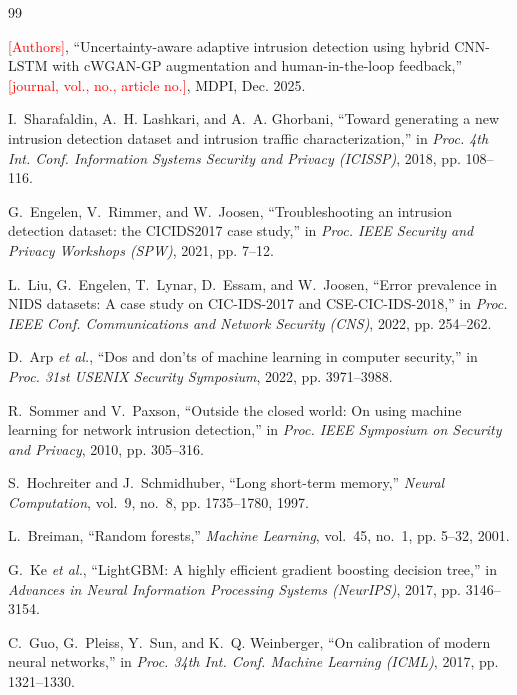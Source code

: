 \documentclass[conference]{IEEEtran}
\newcommand{\todo}[1]{\textcolor{red}{[#1]}}
\begin{document}
\begin{thebibliography}{99}

\todo{Authors}, ``Uncertainty-aware adaptive intrusion detection using hybrid CNN-LSTM with cWGAN-GP augmentation and human-in-the-loop feedback,'' \todo{journal, vol., no., article no.}, MDPI, Dec. 2025.

I.~Sharafaldin, A.~H. Lashkari, and A.~A. Ghorbani, ``Toward generating a new intrusion detection dataset and intrusion traffic characterization,'' in \textit{Proc. 4th Int. Conf. Information Systems Security and Privacy (ICISSP)}, 2018, pp. 108--116.

G.~Engelen, V.~Rimmer, and W.~Joosen, ``Troubleshooting an intrusion detection dataset: the CICIDS2017 case study,'' in \textit{Proc. IEEE Security and Privacy Workshops (SPW)}, 2021, pp. 7--12.

L.~Liu, G.~Engelen, T.~Lynar, D.~Essam, and W.~Joosen, ``Error prevalence in NIDS datasets: A case study on CIC-IDS-2017 and CSE-CIC-IDS-2018,'' in \textit{Proc. IEEE Conf. Communications and Network Security (CNS)}, 2022, pp. 254--262.

D.~Arp \textit{et al.}, ``Dos and don'ts of machine learning in computer security,'' in \textit{Proc. 31st USENIX Security Symposium}, 2022, pp. 3971--3988.

R.~Sommer and V.~Paxson, ``Outside the closed world: On using machine learning for network intrusion detection,'' in \textit{Proc. IEEE Symposium on Security and Privacy}, 2010, pp. 305--316.

S.~Hochreiter and J.~Schmidhuber, ``Long short-term memory,'' \textit{Neural Computation}, vol.~9, no.~8, pp. 1735--1780, 1997.

L.~Breiman, ``Random forests,'' \textit{Machine Learning}, vol.~45, no.~1, pp. 5--32, 2001.

G.~Ke \textit{et al.}, ``LightGBM: A highly efficient gradient boosting decision tree,'' in \textit{Advances in Neural Information Processing Systems (NeurIPS)}, 2017, pp. 3146--3154.

C.~Guo, G.~Pleiss, Y.~Sun, and K.~Q. Weinberger, ``On calibration of modern neural networks,'' in \textit{Proc. 34th Int. Conf. Machine Learning (ICML)}, 2017, pp. 1321--1330.


\end{thebibliography}
\end{document}
